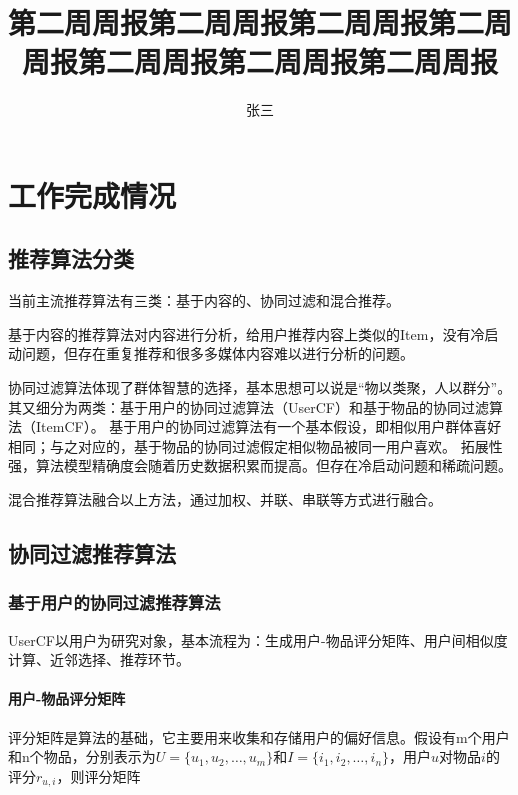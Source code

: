 \documentclass{upctrans}
\begin{document}
\title{第二周周报第二周周报第二周周报第二周周报第二周周报第二周周报第二周周报}
\author{张三}

\maketitle

\section{工作完成情况}

\subsection{推荐算法分类}

当前主流推荐算法有三类：基于内容的、协同过滤和混合推荐。

基于内容的推荐算法对内容进行分析，给用户推荐内容上类似的Item，没有冷启动问题，但存在重复推荐和很多多媒体内容难以进行分析的问题。

协同过滤算法体现了群体智慧的选择，基本思想可以说是“物以类聚，人以群分”。
其又细分为两类：基于用户的协同过滤算法（UserCF）和基于物品的协同过滤算法（ItemCF）。
基于用户的协同过滤算法有一个基本假设，即相似用户群体喜好相同；与之对应的，基于物品的协同过滤假定相似物品被同一用户喜欢。
拓展性强，算法模型精确度会随着历史数据积累而提高。但存在冷启动问题和稀疏问题。

混合推荐算法融合以上方法，通过加权、并联、串联等方式进行融合。

\subsection{协同过滤推荐算法}

\subsubsection{基于用户的协同过滤推荐算法}

UserCF以用户为研究对象，基本流程为：生成用户-物品评分矩阵、用户间相似度计算、近邻选择、推荐环节。

\paragraph{用户-物品评分矩阵}

评分矩阵是算法的基础，它主要用来收集和存储用户的偏好信息。假设有m个用户和n个物品，分别表示为$U=\{u_1,u_2,\dots,u_m\}$和$I=\{i_1,i_2,\dots,i_n\}$，用户$u$对物品$i$的评分${r_{u,i}}$，则评分矩阵
\end{document}
